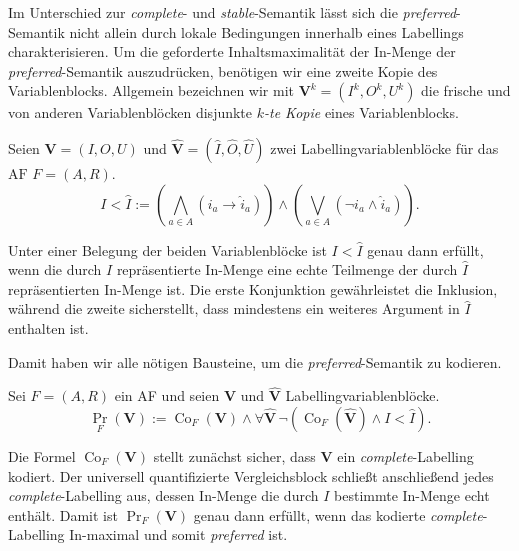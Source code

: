Im Unterschied zur \emph{complete}- und \emph{stable}-Semantik lässt sich die \emph{preferred}-Semantik nicht 
allein durch lokale Bedingungen innerhalb eines Labellings charakterisieren.
Um die geforderte Inhaltsmaximalität der In-Menge der \emph{preferred}-Semantik auszudrücken, benötigen 
wir eine zweite Kopie des Variablenblocks.
Allgemein bezeichnen wir mit \(\mathbf V^k=(I^k,O^k,U^k)\) die frische und von 
anderen Variablenblöcken disjunkte \emph{\(k\)-te Kopie} eines Variablenblocks. 
\begin{Definition}
    \label{def:strict-inclusion}
    Seien \(\mathbf V=(I,O,U)\) und
    \(\widehat{\mathbf V}=(\widehat{I},\widehat{O},\widehat{U})\) zwei Labellingvariablenblöcke für das 
    \(\text{AF } F=(A,R)\).
    \[
        I < \widehat{I}
        :=
        \left(
            \bigwedge_{a\in A}(i_a\rightarrow \widehat{i}_a)
        \right)
        \land
        \left(
            \bigvee_{a\in A}(\neg i_a\land \widehat{i}_a)
        \right).
    \]
\end{Definition}
Unter einer Belegung der beiden Variablenblöcke ist \(I<\widehat I\) genau dann erfüllt, 
wenn die durch \(I\) repräsentierte In-Menge eine echte Teilmenge der durch \(\widehat I\) repräsentierten In-Menge ist. 
Die erste Konjunktion gewährleistet die Inklusion, während die zweite sicherstellt, 
dass mindestens ein weiteres Argument in \(\widehat I\) enthalten ist.

Damit haben wir alle nötigen Bausteine, um die \emph{preferred}-Semantik zu kodieren.
\begin{Definition}
    \label{def:preferred-encoding}
    Sei \(F=(A,R)\) ein AF und seien \(\mathbf V\) und \(\widehat{\mathbf V}\) Labellingvariablenblöcke.
    \[
        \operatorname{Pr}_F(\mathbf V)
        :=
        \operatorname{Co}_F(\mathbf V)
        \land
        \forall\widehat{\mathbf V}\,
        \neg (\operatorname{Co}_F(\widehat{\mathbf V})
        \land I < \widehat{I}).
    \]
\end{Definition}
Die Formel \(\operatorname{Co}_F(\mathbf V)\) stellt zunächst sicher, dass \(\mathbf V\) ein \emph{complete}-Labelling kodiert. 
Der universell quantifizierte Vergleichsblock schließt anschließend jedes \emph{complete}-Labelling aus, 
dessen In-Menge die durch \(I\) bestimmte In-Menge echt enthält. Damit ist \(\operatorname{Pr}_F(\mathbf V)\) 
genau dann erfüllt, wenn das kodierte \emph{complete}-Labelling In-maximal und somit \emph{preferred} ist.

